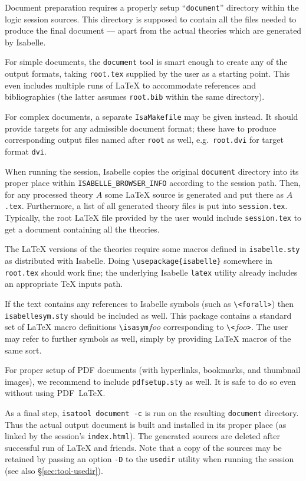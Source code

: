 \medskip Document preparation requires a properly setup ``\texttt{document}''
directory within the logic session sources.  This directory is supposed to
contain all the files needed to produce the final document --- apart from the
actual theories which are generated by Isabelle.

\medskip For simple documents, the \texttt{document} tool is smart enough to
create any of the output formats, taking \texttt{root.tex} supplied by the
user as a starting point.  This even includes multiple runs of {\LaTeX} to
accommodate references and bibliographies (the latter assumes
\texttt{root.bib} within the same directory).

For complex documents, a separate \texttt{IsaMakefile} may be given instead.
It should provide targets for any admissible document format; these have to
produce corresponding output files named after \texttt{root} as well, e.g.\ 
\texttt{root.dvi} for target format \texttt{dvi}.

\medskip When running the session, Isabelle copies the original
\texttt{document} directory into its proper place within
\texttt{ISABELLE_BROWSER_INFO} according to the session path.  Then, for any
processed theory $A$ some {\LaTeX} source is generated and put there as
$A$\texttt{.tex}.  Furthermore, a list of all generated theory files is put
into \texttt{session.tex}.  Typically, the root {\LaTeX} file provided by the
user would include \texttt{session.tex} to get a document containing all the
theories.

The {\LaTeX} versions of the theories require some macros defined in
\texttt{isabelle.sty} as distributed with Isabelle.  Doing
\verb,\usepackage{isabelle}, somewhere in \texttt{root.tex} should work fine;
the underlying Isabelle \texttt{latex} utility already includes an appropriate
{\TeX} inputs path.

If the text contains any references to Isabelle symbols (such as
\verb,\<forall>,) then \texttt{isabellesym.sty} should be included as well.
This package contains a standard set of {\LaTeX} macro definitions
\verb,\isasym,$foo$ corresponding to \verb,\<,$foo$\verb,>,.  The user may
refer to further symbols as well, simply by providing {\LaTeX} macros of the
same sort.

For proper setup of PDF documents (with hyperlinks, bookmarks, and thumbnail
images), we recommend to include \verb,pdfsetup.sty, as well.  It is safe to
do so even without using PDF~\LaTeX.

\medskip As a final step, \texttt{isatool document -c} is run on the resulting
\texttt{document} directory.  Thus the actual output document is built and
installed in its proper place (as linked by the session's
\texttt{index.html}).  The generated sources are deleted after successful run
of {\LaTeX} and friends.  Note that a copy of the sources may be retained by
passing an option \texttt{-D} to the \texttt{usedir} utility when running the
session (see also \S\ref{sec:tool-usedir}).


